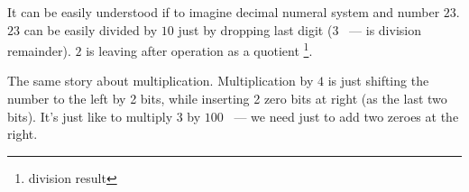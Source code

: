 
\label{division_by_shifting}
{It can be easily understood if to imagine decimal numeral system and number $23$.
$23$ can be easily divided by $10$ just by dropping last digit ($3$ ~--- is division remainder). 
$2$ is leaving after operation as a quotient
\footnote{division result}.}

{The same story about multiplication.
Multiplication by $4$ is just shifting the number to the left by 2 bits,
while inserting 2 zero bits at right (as the last two bits).
It's just like to multiply $3$ by $100$ ~--- we need just to add two zeroes at the right.}


